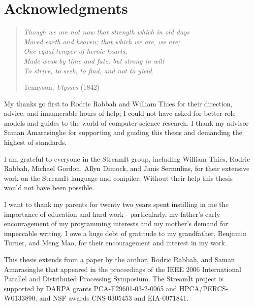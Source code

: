 \cleardoublepage
\setcounter{savepage}{\thepage}
\begin{abstractpage}

\end{abstractpage}

% 

\cleardoublepage

\section*{Acknowledgments}

\begin{quote}
\noindent\textit{Though we are not now that strength which in old days\\
Moved earth and heaven; that which we are, we are;\\
One equal temper of heroic hearts,\\
Made weak by time and fate, but strong in will\\
To strive, to seek, to find, and not to yield.
}

Tennyson, \textit{Ulysses} (1842)
\end{quote}

My thanks go first to Rodric Rabbah and William Thies for 
their direction, advice, and innumerable hours of help; I could
not have asked for better role models and guides to the world
of computer science research. 
I thank my advisor Saman Amarasinghe for supporting and guiding
this thesis and demanding the highest of standards.

I am grateful to everyone in the StreamIt group, including William Thies, 
Rodric Rabbah, Michael Gordon, Allyn Dimock, and Janis Sermulins,
for their extensive work on the StreamIt language and compiler. Without
their help this thesis would not have been possible.

I want to thank my parents for twenty two years spent instilling in me the 
importance of education and hard work - particularly, my father's
early encouragement of my programming interests and my mother's 
demand for impeccable writing. 
I owe a huge debt of gratitude to my grandfather, Benjamin Turner, 
and Meng Mao, for their encouragement and interest in my work.

This thesis extends from a paper\cite{drake:ipdps:2006} by
the author, Rodric Rabbah, and Saman Amarasinghe that appeared in
the proceedings of the 
IEEE 2006 International Parallel and Distributed Processing
Symposium. 
The StreamIt project is supported by DARPA grants 
PCA-F29601-03-2-0065 and HPCA/PERCS-W0133890, and
NSF awards CNS-0305453 and EIA-0071841.

